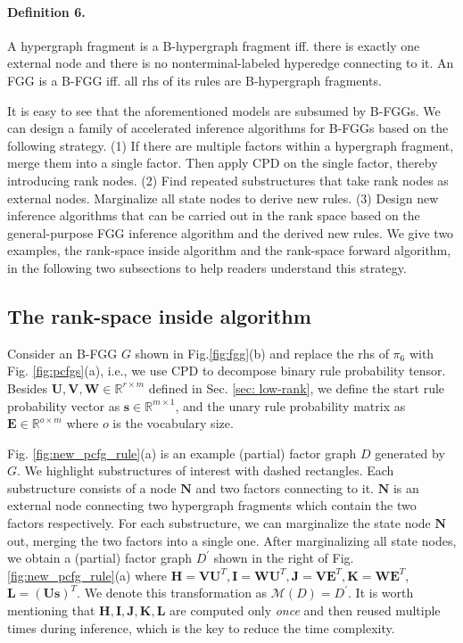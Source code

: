 \documentclass[11pt]{article}
\newcommand{\vect}[1]{\boldsymbol{\mathbf{#1}}}
\newcommand{\rv}[1]{\mathbf{#1}}
\begin{document}
\paragraph{Definition 6.} A hypergraph fragment is a B-hypergraph fragment iff. there is exactly one external node and there is no nonterminal-labeled hyperedge connecting to it. An FGG is a B-FGG iff. all rhs of its rules are B-hypergraph fragments.

\smallskip
It is easy to see that the aforementioned models are subsumed by B-FGGs. We can design a family of accelerated inference algorithms for B-FGGs based on the following strategy. (1) If there are multiple factors within a hypergraph fragment, merge them into a single factor. Then apply CPD on the single factor, thereby introducing rank nodes. (2) Find repeated substructures that take rank nodes as external nodes.  Marginalize all state nodes to derive new rules. (3) Design new inference algorithms that can be carried out in the rank space based on the general-purpose FGG inference algorithm and the derived new rules. We give two examples, the rank-space inside algorithm and the rank-space forward algorithm, in the following two subsections to help readers understand this strategy.

\subsection{The rank-space inside algorithm}
\label{sec:rank-inside}
Consider an B-FGG $G$ shown in Fig.\ref{fig:fgg}(b) and replace the rhs of $\pi_6$ with Fig. \ref{fig:pcfgs}(a), i.e., we use CPD to decompose binary rule probability tensor. Besides $\vect{U},\vect{V},\vect{W} \in \mathbb{R}^{r \times m}$ defined in Sec. \ref{sec: low-rank}, we define the start rule probability vector as $\vect{s}\in \mathbb{R}^{m \times 1}$, and the unary rule probability matrix as $\vect{E} \in \mathbb{R}^{o \times m}$ where $o$ is the vocabulary size.

Fig. \ref{fig:new_pcfg_rule}(a) is an example (partial) factor graph $D$ generated by $G$. We highlight substructures of interest with dashed rectangles. Each substructure consists of a node $\rv{N}$ and two factors connecting to it. $\rv{N}$ is an external node connecting two hypergraph fragments which contain the two factors respectively. For each substructure, we can marginalize the state 
node $\rv{N}$ out, merging the two factors into a single one. After marginalizing all state 
nodes, we obtain a (partial) factor graph $D^{\prime}$ shown in the right of Fig. \ref{fig:new_pcfg_rule}(a) where $\vect{H} = \vect{V}\vect{U}^{T}, \vect{I} = \vect{W}\vect{U}^{T}, \vect{J} = \vect{V}\vect{E}^{T}, \vect{K}=\vect{W}\vect{E}^{T}$, $\vect{L}=(\vect{U}\vect{s})^{T}$. We denote this transformation as $\mathcal{M}(D)=D^{\prime}$. It is worth mentioning that $\vect{H}, \vect{I}, \vect{J}, \vect{K}, \vect{L}$ are computed only \emph{once} and then reused multiple times during inference, which is the key to reduce the time complexity. 
\end{document}
